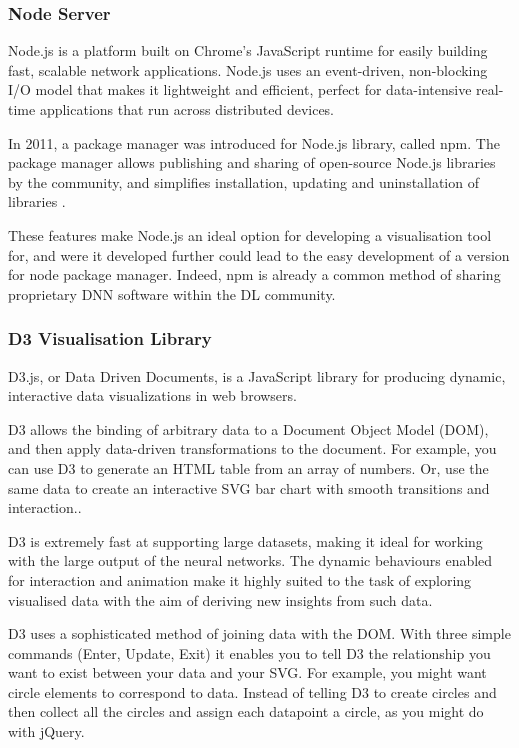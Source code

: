 \documentclass[a4paper,11pt,titlepage]{article}
\begin{document}
	\subsubsection{Node Server}
		Node.js is a platform built on Chrome's JavaScript runtime for easily building fast, scalable network applications. Node.js uses an event-driven, non-blocking I/O model that makes it lightweight and efficient, perfect for data-intensive real-time applications that run across distributed devices.\cite{Dahl2009}
		\par 
		In 2011, a package manager was introduced for Node.js library, called npm. The package manager allows publishing and sharing of open-source Node.js libraries by the community, and simplifies installation, updating and uninstallation of libraries \cite{Dahl2009}.
		\par 
		These features make Node.js an ideal option for developing a visualisation tool for, and were it developed further could lead to the easy development of a version for node package manager. Indeed, npm is already a common method of sharing proprietary DNN software within the DL community.
		 
		\subsubsection{D3 Visualisation Library}
		D3.js, or Data Driven Documents, is a JavaScript library for producing dynamic, interactive data visualizations in web browsers.
		\par 
		D3 allows the binding of arbitrary data to a Document Object Model (DOM), and then apply data-driven transformations to the document. For example, you can use D3 to generate an HTML table from an array of numbers. Or, use the same data to create an interactive SVG bar chart with smooth transitions and interaction.\cite{Bostock2011a}.
		\par
		D3 is extremely fast at supporting large datasets, making it ideal for working with the large output of the neural networks. The dynamic behaviours enabled for interaction and animation make it highly suited to the task of exploring visualised data with the aim of deriving new insights from such data.

	D3 uses a sophisticated method of joining data with the DOM. With three simple commands (Enter, Update, Exit) it enables you to tell D3 the relationship you want to exist between your data and your SVG. For example, you might want circle elements to correspond to data. Instead of telling D3 to create circles and then collect all the circles and assign each datapoint a circle, as you might do with jQuery.
	
\end{document}

